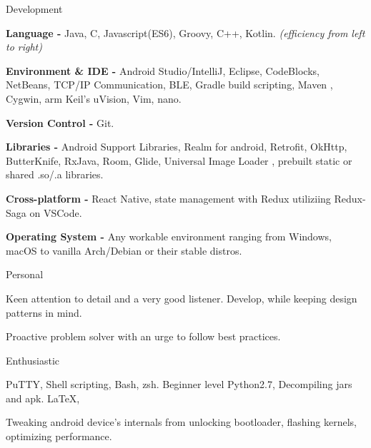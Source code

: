 

\begin{skillsentries}
  
  \skillsentry
    {Development} %
    {
      \begin{skillsitems} %
        \item {\textbf{Language -} Java, C, Javascript(ES6), Groovy, C++, Kotlin. \textsl{(efficiency from left to right)}}
        \item {\textbf{Environment \& IDE -} Android Studio/IntelliJ, Eclipse, CodeBlocks, NetBeans, TCP/IP Communication, BLE, Gradle build scripting, Maven
        , Cygwin, arm Keil's uVision, Vim, nano.}
        \item {\textbf{Version Control -} Git.}
        \item {\textbf{Libraries -} Android Support Libraries, Realm for android, Retrofit, OkHttp, ButterKnife, RxJava, Room, Glide, Universal Image Loader
        , prebuilt static or shared .so/.a libraries.}
        \item {\textbf{Cross-platform -} React Native, state management with Redux utiliziing Redux-Saga on VSCode.}
        \item {\textbf{Operating System - } Any workable environment ranging from Windows, macOS to vanilla Arch/Debian or their stable distros.}
      \end{skillsitems}
    }

    
    \skillsentry
    {Personal} %
    {
      \begin{skillsitems} %
        \item {Keen attention to detail and a very good listener. Develop, while keeping design patterns in mind.}
        \item {Proactive problem solver with an urge to follow best practices.}
      \end{skillsitems}
      }
      
      \skillsentry
      {Enthusiastic} %
      {
        \begin{skillsitems} %
          \item {PuTTY, Shell scripting, Bash, zsh. Beginner level Python2.7, Decompiling jars and apk. LaTeX,}
          \item {Tweaking android device's internals from unlocking bootloader, flashing kernels, optimizing performance.}
        \end{skillsitems}
      }
\end{skillsentries}
